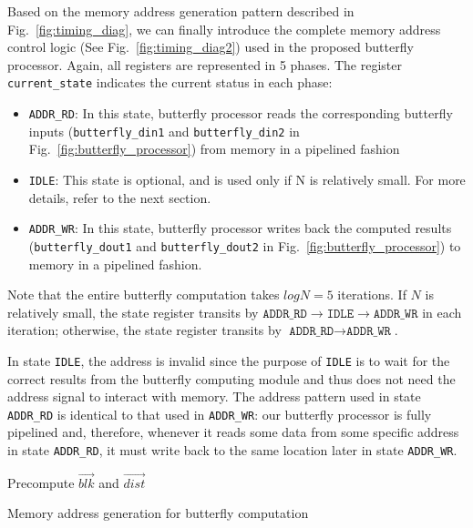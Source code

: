 \documentclass[submission]{iacrtrans}
\theoremstyle{plain}
\begin{document}
Based on the memory address generation pattern described in Fig.~\ref{fig:timing_diag}, we can finally introduce the complete memory address control logic (See Fig.~\ref{fig:timing_diag2}) used in the proposed butterfly processor. Again, all registers are represented in 5 phases. The register \texttt{current\_state} indicates the current status in each phase:
\begin{itemize}
    \item \texttt{ADDR\_RD}: In this state, butterfly processor reads the corresponding butterfly inputs (\texttt{butterfly\_din1} and \texttt{butterfly\_din2} in Fig.~\ref{fig:butterfly_processor}) from memory in a pipelined fashion
    \item \texttt{IDLE}: This state is optional, and is used only if N is relatively small. For more details, refer to the next section.
    \item \texttt{ADDR\_WR}: In this state, butterfly processor writes back the computed results (\texttt{butterfly\_dout1} and \texttt{butterfly\_dout2} in Fig.~\ref{fig:butterfly_processor}) to memory in a pipelined fashion.
\end{itemize}

Note that the entire butterfly computation takes $logN=5$ iterations. If $N$ is relatively small, the state register transits by $\texttt{ADDR\_RD}\to \texttt{IDLE}\to \texttt{ADDR\_WR}$ in each iteration; otherwise, the state register transits by $\texttt{ADDR\_RD}\to \texttt{ADDR\_WR}$.

In state \texttt{IDLE}, the address is invalid since the purpose of \texttt{IDLE} is to wait for the correct results from the butterfly computing module and thus does not need the address signal to interact with memory. The address pattern used in state \texttt{ADDR\_RD} is identical to that used in \texttt{ADDR\_WR}: our butterfly processor is fully pipelined and, therefore, whenever it reads some data from some specific address in state \texttt{ADDR\_RD}, it must write back to the same location later in state \texttt{ADDR\_WR}.

\begin{algorithm}[!tbh]
 \DontPrintSemicolon %
    Precompute $\vec{blk}$ and $\vec{dist}$\;
    
 \caption{Memory address generation for butterfly computation}\label{alg:addrgen}
\end{algorithm}
\end{document}
